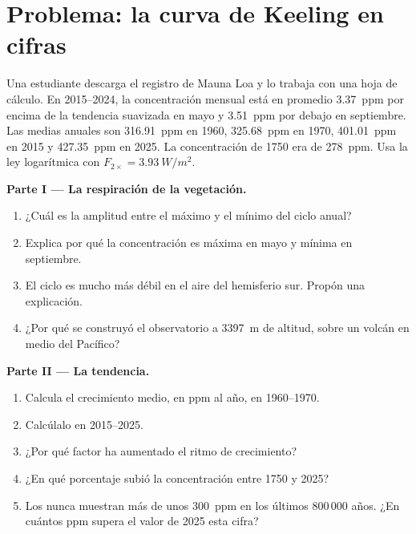 \section{Problema: la curva de Keeling en cifras}

\begin{problem}
\label{pb:g12:climate-change:1}
Una estudiante descarga el registro de Mauna Loa y lo trabaja con una
hoja de cálculo. En 2015--2024, la concentración mensual está en promedio
\qty{3.37}{ppm} por encima de la tendencia suavizada en mayo y \qty{3.51}{ppm} por debajo
en septiembre. Las medias anuales son \qty{316.91}{ppm} en 1960,
\qty{325.68}{ppm} en 1970, \qty{401.01}{ppm} en 2015 y \qty{427.35}{ppm}
en 2025. La concentración de 1750 era de \qty{278}{ppm}. Usa la ley logarítmica
con $F_{2\times} = \qty{3.93}{W/m^2}$.

\medskip
\noindent\textbf{Parte I --- La respiración de la vegetación.}
\begin{enumerate}
  \item ¿Cuál es la amplitud entre el máximo y el mínimo del ciclo anual?
  \item Explica por qué la concentración es máxima en mayo y mínima en
        septiembre.
  \item El ciclo es mucho más débil en el aire del hemisferio sur.
        Propón una explicación.
  \item ¿Por qué se construyó el observatorio a \qty{3397}{m} de altitud, sobre un volcán en
        medio del Pacífico?
\end{enumerate}

\medskip
\noindent\textbf{Parte II --- La tendencia.}
\begin{enumerate}[resume]
  \item Calcula el crecimiento medio, en ppm al año, en 1960--1970.
  \item Calcúlalo en 2015--2025.
  \item ¿Por qué factor ha aumentado el ritmo de crecimiento?
  \item ¿En qué porcentaje subió la concentración entre 1750 y
        2025?
  \item Los  nunca muestran más de unos \qty{300}{ppm} en los
        últimos 800\,000 años. ¿En cuántos ppm supera el valor de 2025
        esta cifra?
\end{enumerate}


\end{problem}

